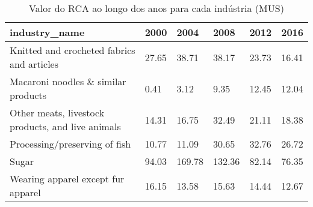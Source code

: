 \begin{table}
\centering
\caption{Valor do RCA ao longo dos anos para cada indústria (MUS)}
\begin{tabular}{p{6cm}p{1.5cm}p{1.5cm}p{1.5cm}p{1.5cm}p{1.5cm}}
\toprule
                                    industry\_name &  2000 &   2004 &   2008 &  2012 &  2016 \\
\midrule
       Knitted and crocheted fabrics and articles & 27.65 &  38.71 &  38.17 & 23.73 & 16.41 \\
              Macaroni noodles \& similar products &  0.41 &   3.12 &   9.35 & 12.45 & 12.04 \\
Other meats, livestock products, and live animals & 14.31 &  16.75 &  32.49 & 21.11 & 18.38 \\
                    Processing/preserving of fish & 10.77 &  11.09 &  30.65 & 32.76 & 26.72 \\
                                            Sugar & 94.03 & 169.78 & 132.36 & 82.14 & 76.35 \\
               Wearing apparel except fur apparel & 16.15 &  13.58 &  15.63 & 14.44 & 12.67 \\
\bottomrule
\end{tabular}
\end{table}
